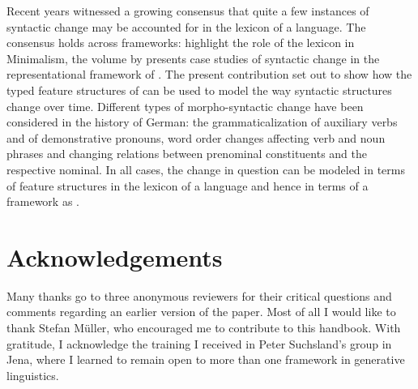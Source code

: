 \documentclass[output=paper
	        ,collection
	        ,collectionchapter
 	        ,biblatex
                ,babelshorthands
                ,newtxmath
                ,draftmode
                ,colorlinks, citecolor=brown
]{./langsci/langscibook}
\begin{document}
Recent years witnessed a growing consensus that quite a few  instances of syntactic change may be accounted for in the lexicon of a language. The consensus holds across frameworks: \cite{BiWa2015} highlight the role of the lexicon in Minimalism, the volume by \cite{BuKi2001} presents case studies of syntactic change in the representational framework of \lfg. The present contribution set out to show how the typed feature structures of \hpsg can be used to model the way syntactic structures change over time. Different types of morpho-syntactic change have been considered in the history of German: the grammaticalization of auxiliary verbs and of demonstrative pronouns, word order changes affecting verb and noun phrases and changing relations between prenominal constituents and the respective nominal. In all cases, the change in question can be modeled in terms of feature structures in the lexicon of a language and hence in terms of a framework as \hpsg.  


\section*{Acknowledgements}
Many thanks go to three anonymous reviewers for their critical questions and comments regarding an earlier version of the paper. Most of all I would like to thank Stefan Müller, who encouraged me to contribute to this handbook. With gratitude, I acknowledge the training I received in Peter Suchsland's group in Jena, where I learned to remain open to more than one framework in generative linguistics.



\nocite{Schoene1939a,Lindo1966a,DeReKo-dia,Simplicissimus}
{\sloppy
\printbibliography[heading=diachrony-sources,keyword=diachrony-source]
}
\end{document}
